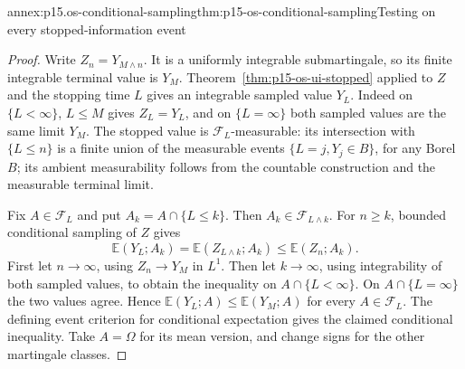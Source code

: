 \begin{annexitem}{annex:p15.os-conditional-sampling}{thm:p15-os-conditional-sampling}{Testing on every stopped-information event}
\begin{proof}
Write \(Z_n=Y_{M\wedge n}\).
It is a uniformly integrable submartingale, so its finite
integrable terminal value is \(Y_M\).
Theorem~\ref{thm:p15-os-ui-stopped} applied to \(Z\) and the
stopping time \(L\) gives an integrable sampled value \(Y_L\).
Indeed on \(\{L<\infty\}\), \(L\leq M\) gives
\(Z_L=Y_L\), and on \(\{L=\infty\}\) both sampled values
are the same limit \(Y_M\).
The stopped value is \(\mathcal F_L\)-measurable: its intersection
with \(\{L\leq n\}\) is a finite union of the measurable
events \(\{L=j,Y_j\in B\}\), for any Borel \(B\); its
ambient measurability follows from the countable construction
and the measurable terminal limit.

Fix \(A\in\mathcal F_L\) and put \(A_k=A\cap\{L\leq k\}\).
Then \(A_k\in\mathcal F_{L\wedge k}\).
For \(n\geq k\), bounded conditional sampling of \(Z\) gives
\[
 \mathbb E(Y_L;A_k)
   =\mathbb E(Z_{L\wedge k};A_k)\leq\mathbb E(Z_n;A_k).
 \]
First let \(n\to\infty\), using \(Z_n\to Y_M\) in \(L^1\).
Then let \(k\to\infty\), using integrability of both sampled
values, to obtain the inequality on \(A\cap\{L<\infty\}\).
On \(A\cap\{L=\infty\}\) the two values agree.
Hence \(\mathbb E(Y_L;A)\leq\mathbb E(Y_M;A)\) for every
\(A\in\mathcal F_L\). The defining event criterion for conditional
expectation gives the claimed conditional inequality.
Take \(A=\Omega\) for its mean version, and change signs for
the other martingale classes.
\end{proof}
\end{annexitem}

